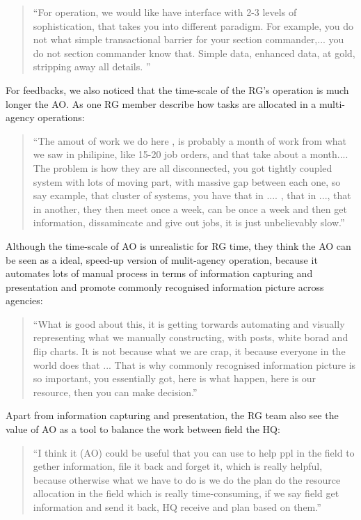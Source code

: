 \begin{quotation}
``For operation, we would like have interface with 2-3 levels of sophistication, that takes you into different paradigm. For example, you do not what simple transactional barrier for your section commander,...  you do not section commander know that. Simple data, enhanced data, at gold, stripping away all details. ''
\end{quotation}

For feedbacks, we also noticed that the time-scale of the RG's operation is much longer the AO. As one RG member describe how tasks are allocated in a multi-agency operations: 

\begin{quotation}
``The amout of work we do here , is probably a month of work from what we saw in philipine, like 15-20 job orders, and that take about a month.... The problem is how they are all disconnected, you got tightly coupled system with lots of moving part, with massive gap between each one, so say example, that cluster of systems, you have that in .... , that in ..., that in another, they then meet once a week, can be once a week and then get information, dissamincate and give out jobs, it is just unbelievably slow.''
\end{quotation}

Although the time-scale of AO is unrealistic for RG time,  they think the AO can be seen as a ideal, speed-up version of mulit-agency operation, because it automates lots of manual process in terms of information capturing and presentation and promote commonly recognised information picture across agencies:

\begin{quotation}
``What is good about this, it is getting torwards automating and visually representing what we manually constructing, with posts, white borad and flip charts. It is not because what we are crap, it because everyone in the world does that ...  That is why commonly recognised information picture is so important, you essentially got, here is what happen, here is our resource, then you can make decision.''
\end{quotation}

Apart from information capturing and presentation, the RG team also see the value of AO as a tool to balance the work between field the HQ: 

\begin{quotation}
``I think it (AO) could be useful that you can use to help ppl in the field to gether information, file it back and forget it, which is really helpful, because otherwise what we have to do is we do the plan do the resource allocation in the field which is really time-consuming, if we say field get information and send it back, HQ receive and plan based on them.''
\end{quotation}

